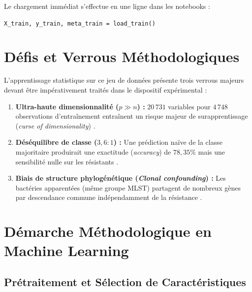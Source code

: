 \documentclass[11pt,a4paper]{article}
\begin{document}
Le chargement immédiat s'effectue en une ligne dans les notebooks :
\begin{center}
\texttt{X\_train, y\_train, meta\_train = load\_train()}
\end{center}

\section{Défis et Verrous Méthodologiques}

\begin{infobox}
L'apprentissage statistique sur ce jeu de données présente trois verrous majeurs devant être impérativement traités dans le dispositif expérimental :
\begin{enumerate}[leftmargin=*]
    \item \textbf{Ultra-haute dimensionnalité ($p \gg n$) :} $20\,731$ variables pour $4\,748$ observations d'entraînement entraînent un risque majeur de surapprentissage (\textit{curse of dimensionality}) \citep{donoho2000highdim,bellman1957dynamic}.
    \item \textbf{Déséquilibre de classe ($3,6 : 1$) :} Une prédiction naïve de la classe majoritaire produirait une exactitude (\textit{accuracy}) de $78,35\%$ mais une sensibilité nulle sur les résistants \citep{he2009learning}.
    \item \textbf{Biais de structure phylogénétique (\textit{Clonal confounding}) :} Les bactéries apparentées (même groupe MLST) partagent de nombreux gènes par descendance commune indépendamment de la résistance \citep{earle2016identifying,moradigaravand2018prediction}.
\end{enumerate}
\end{infobox}

\section{Démarche Méthodologique en Machine Learning}

\subsection{Prétraitement et Sélection de Caractéristiques}
\end{document}

